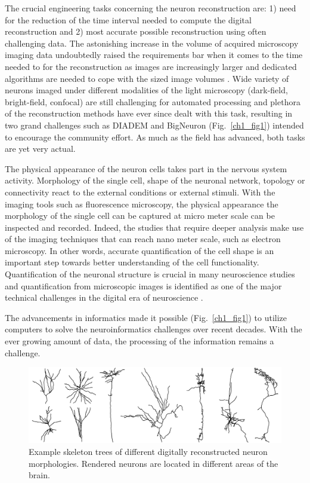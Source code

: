The crucial engineering tasks concerning the neuron reconstruction are: 1) need for the reduction of the time interval needed to compute the digital reconstruction and 2) most accurate possible reconstruction using often challenging data. The astonishing increase in the volume of acquired microscopy imaging data \cite{meijering2016imagining} undoubtedly raised the requirements bar when it comes to the time needed to for the reconstruction as images are increasingly larger and dedicated algorithms are needed to cope with the sized image volumes \cite{peng2017automatic}. Wide variety of neurons imaged under different modalities of the light microscopy (dark-field, bright-field, confocal) are still challenging for automated processing \cite{svoboda2011past,peng2011proof} and plethora of the reconstruction methods \cite{peng2011automatic} have ever since dealt with this task, resulting in two grand challenges such as DIADEM and BigNeuron \cite{peng2015diadem,peng2015bigneuron,gillette2011diademchallenge} (Fig.~\ref{ch1_fig1}) intended to encourage the community effort. As much as the field has advanced, both tasks are yet very actual.


The physical appearance of the neuron cells takes part in the nervous system activity. Morphology of the single cell, shape of the neuronal network, topology or connectivity react to the external conditions or external stimuli. With the imaging tools such as fluorescence microscopy, the physical appearance the morphology of the single cell can be captured at micro meter scale can be inspected and recorded. Indeed, the studies that require deeper analysis make use of the imaging techniques that can reach nano meter scale, such as electron microscopy. In other words, accurate quantification of the cell shape is an important step towards better understanding of the cell functionality. Quantification of the neuronal structure is crucial in many neuroscience studies \cite{halavi2012digital} and quantification from microscopic images is identified as one of the major technical challenges in the digital era of neuroscience \cite{peng2015diadem}.

The advancements in informatics made it possible (Fig.~\ref{ch1_fig1}) to utilize computers to solve the neuroinformatics challenges over recent decades. With the ever growing amount of data, the processing of the information remains a challenge.   

\begin{figure}
	\begin{center}
		\includegraphics[width=\textwidth]{ch1_fig7}
	\end{center}
	\caption{Example skeleton trees of different digitally reconstructed neuron morphologies. Rendered neurons are located in different areas of the brain.}
	\label{ch1_fig7}
\end{figure}

